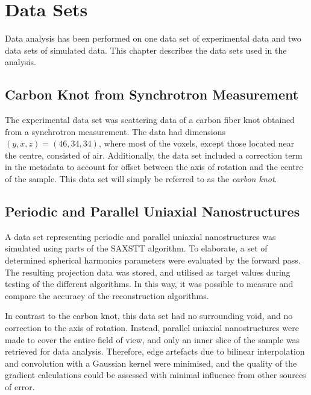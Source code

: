 \chapter{Data Sets} %
\label{ch:reconstruction_data_sets}

Data analysis has been performed on one data set of experimental data and two data sets of simulated data.
This chapter describes the data sets used in the analysis.

\section{Carbon Knot from Synchrotron Measurement} %
\label{sec:data_set_carbon_knot}
The experimental data set was scattering data of a carbon fiber knot obtained from a synchrotron measurement.
The data had dimensions $(y,x,z) = (46,34,34)$, where most of the voxels, except those located near the centre, consisted of air.  %
Additionally, the data set included a correction term in the metadata to account for offset between the axis of rotation
and the centre of the sample. This data set will simply be referred to as the \emph{carbon knot}.


\section{Periodic and Parallel Uniaxial Nanostructures} %
\label{sec:reconstruction_data_sets_periodic_parallel_uniaxial_nanostructures}
A data set representing periodic and parallel uniaxial nanostructures was simulated using parts of the SAXSTT algorithm.
To elaborate, a set of determined spherical harmonics parameters were evaluated by the forward pass.
The resulting projection data was stored, and utilised as target values during testing of the different algorithms.
In this way, it was possible to measure and compare the accuracy of the reconstruction algorithms.

In contrast to the carbon knot, this data set had no surrounding void, and no correction to the axis of rotation.
Instead, parallel uniaxial nanostructures were made to cover the entire field of view, and only an inner slice of the sample was retrieved for data analysis.
Therefore, edge artefacts due to bilinear interpolation and convolution with a Gaussian kernel were minimised,
and the quality of the gradient calculations could be assessed with minimal influence from other sources of error.

